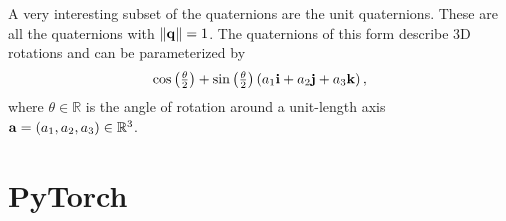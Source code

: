 		A very interesting subset of the quaternions are the unit quaternions. These are all the quaternions with $\lVert \mathbf{q} \rVert = 1$. 
		The quaternions of this form describe 3D rotations and can be parameterized by
		\begin{equation}
			\cos\left(\tfrac{\theta}{2}\right) + 
			\sin\left(\tfrac{\theta}{2}\right) \left(a_1 \mathbf{i} + a_2 \mathbf{j} + a_3 \mathbf{k}\right),
		\end{equation}
		where $\theta \in \mathbb{R}$ is the angle of rotation around a unit-length axis $\mathbf{a} = (a_1, a_2, a_3) \in \mathbb{R}^3$.
	
	\section{PyTorch}